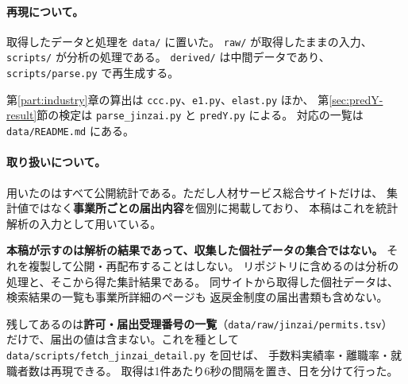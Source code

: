 \paragraph{再現について。}
取得したデータと処理を \texttt{data/} に置いた。
\texttt{raw/} が取得したままの入力、\texttt{scripts/} が分析の処理である。
\texttt{derived/} は中間データであり、\texttt{scripts/parse.py} で再生成する。

第\ref{part:industry}章の算出は \texttt{ccc.py}、\texttt{e1.py}、\texttt{elast.py} ほか、
第\ref{sec:predY-result}節の検定は \texttt{parse\_jinzai.py} と \texttt{predY.py} による。
対応の一覧は \texttt{data/README.md} にある。

\paragraph{取り扱いについて。}
用いたのはすべて公開統計である。ただし人材サービス総合サイトだけは、
集計値ではなく\textbf{事業所ごとの届出内容}を個別に掲載しており、
本稿はこれを統計解析の入力として用いている。

\textbf{本稿が示すのは解析の結果であって、収集した個社データの集合ではない。}
それを複製して公開・再配布することはしない。
リポジトリに含めるのは分析の処理と、そこから得た集計結果である。
同サイトから取得した個社データは、検索結果の一覧も事業所詳細のページも
返戻金制度の届出書類も含めない。

残してあるのは\textbf{許可・届出受理番号の一覧}（\texttt{data/raw/jinzai/permits.tsv}）
だけで、届出の値は含まない。これを種として
\texttt{data/scripts/fetch\_jinzai\_detail.py} を回せば、
手数料実績率・離職率・就職者数は再現できる。
取得は1件あたり6秒の間隔を置き、日を分けて行った。

